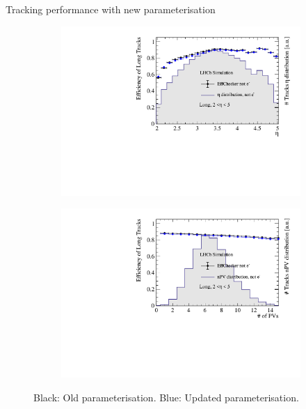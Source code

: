 \documentclass[xcolor={dvipsnames}]{beamer}
\begin{document}
\begin{frame}{Tracking performance with new parameterisation}
\begin{figure}[htb]
\begin{subfigure}{0.45\textwidth}
      \includegraphics[width=1\textwidth]{Plots/TrackEfficiency_eta_bad_MC_parameterisation.pdf}
    \end{subfigure}%
    \begin{subfigure}{0.45\textwidth}
      \includegraphics[width=1\textwidth]{Plots/TrackEfficiency_nPV_bad_MC_parameterisation.pdf}
    \end{subfigure}
    \vspace{-0.2cm}
    \caption*{Black: Old parameterisation. {\color{blue}Blue: Updated parameterisation}.}
  \end{figure}
\end{frame}
\end{document}
